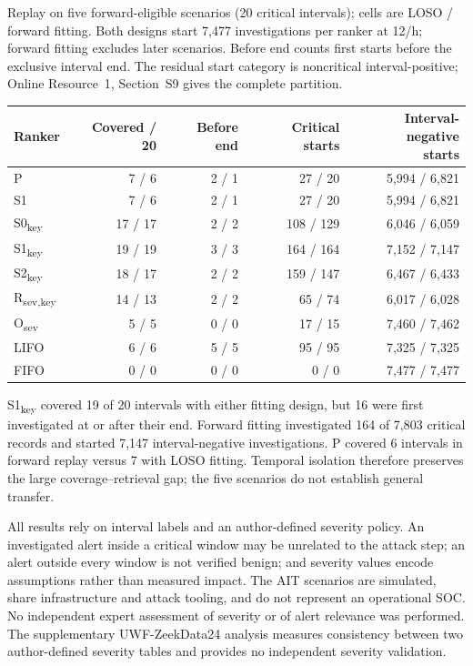 \documentclass[pdflatex,sn-basic,Numbered]{sn-jnl}
\newcommand{\key}{\textsubscript{key}}
\newcommand{\Rsev}{R\textsubscript{sev,key}}
\begin{document}
\begin{tableorg}[t]
\centering
\caption{Replay on five forward-eligible scenarios (20 critical intervals); cells are LOSO / forward fitting. Both designs start 7,477 investigations per ranker at 12/h; forward fitting excludes later scenarios. Before end counts first starts before the exclusive interval end. The residual start category is noncritical interval-positive; Online Resource~1, Section~S9 gives the complete partition.}
\label{tab:forward-replay}
\small
\begin{tabular}{lrrrr}
\toprule
Ranker & Covered / 20 & Before end & Critical starts & \shortstack{Interval-negative\\starts} \\
\midrule
P & 7 / 6 & 2 / 1 & 27 / 20 & 5,994 / 6,821 \\
S1 & 7 / 6 & 2 / 1 & 27 / 20 & 5,994 / 6,821 \\
S0\key & 17 / 17 & 2 / 2 & 108 / 129 & 6,046 / 6,059 \\
S1\key & 19 / 19 & 3 / 3 & 164 / 164 & 7,152 / 7,147 \\
S2\key & 18 / 17 & 2 / 2 & 159 / 147 & 6,467 / 6,433 \\
\Rsev & 14 / 13 & 2 / 2 & 65 / 74 & 6,017 / 6,028 \\
O\textsubscript{sev} & 5 / 5 & 0 / 0 & 17 / 15 & 7,460 / 7,462 \\
LIFO & 6 / 6 & 5 / 5 & 95 / 95 & 7,325 / 7,325 \\
FIFO & 0 / 0 & 0 / 0 & 0 / 0 & 7,477 / 7,477 \\
\bottomrule
\end{tabular}
\unskip
\end{tableorg}

S1\key{} covered 19 of 20 intervals with either fitting design, but 16 were first investigated at or after their end. Forward fitting investigated 164 of 7,803 critical records and started 7,147 interval-negative investigations. P covered 6 intervals in forward replay versus 7 with LOSO fitting. Temporal isolation therefore preserves the large coverage--retrieval gap; the five scenarios do not establish general transfer.

All results rely on interval labels and an author-defined severity policy. An investigated alert inside a critical window may be unrelated to the attack step; an alert outside every window is not verified benign; and severity values encode assumptions rather than measured impact. The AIT scenarios are simulated, share infrastructure and attack tooling, and do not represent an operational SOC. No independent expert assessment of severity or of alert relevance was performed. The supplementary UWF-ZeekData24 analysis measures consistency between two author-defined severity tables and provides no independent severity validation.
\end{document}
